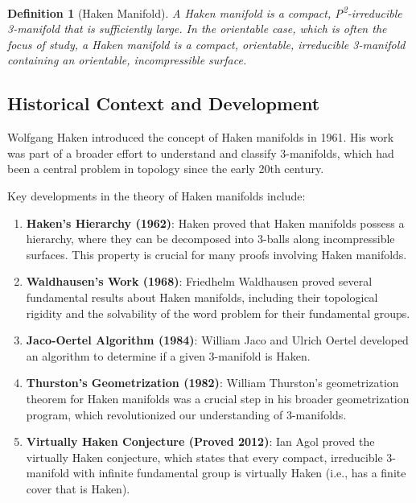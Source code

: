 \documentclass{article}
\newtheorem{definition}{Definition}
\begin{document}
\begin{definition}[Haken Manifold]
A Haken manifold is a compact, P\textsuperscript{2}-irreducible 3-manifold that is sufficiently large. In the orientable case, which is often the focus of study, a Haken manifold is a compact, orientable, irreducible 3-manifold containing an orientable, incompressible surface.
\end{definition}

\subsection{Historical Context and Development}

Wolfgang Haken introduced the concept of Haken manifolds in 1961. His work was part of a broader effort to understand and classify 3-manifolds, which had been a central problem in topology since the early 20th century.

Key developments in the theory of Haken manifolds include:

\begin{enumerate}
  \item \textbf{Haken's Hierarchy (1962)}: Haken proved that Haken manifolds possess a hierarchy, where they can be decomposed into 3-balls along incompressible surfaces. This property is crucial for many proofs involving Haken manifolds.
  
  \item \textbf{Waldhausen's Work (1968)}: Friedhelm Waldhausen proved several fundamental results about Haken manifolds, including their topological rigidity and the solvability of the word problem for their fundamental groups.
  
  \item \textbf{Jaco-Oertel Algorithm (1984)}: William Jaco and Ulrich Oertel developed an algorithm to determine if a given 3-manifold is Haken.
  
  \item \textbf{Thurston's Geometrization (1982)}: William Thurston's geometrization theorem for Haken manifolds was a crucial step in his broader geometrization program, which revolutionized our understanding of 3-manifolds.
  
  \item \textbf{Virtually Haken Conjecture (Proved 2012)}: Ian Agol proved the virtually Haken conjecture, which states that every compact, irreducible 3-manifold with infinite fundamental group is virtually Haken (i.e., has a finite cover that is Haken).
\end{enumerate}
\end{document}
